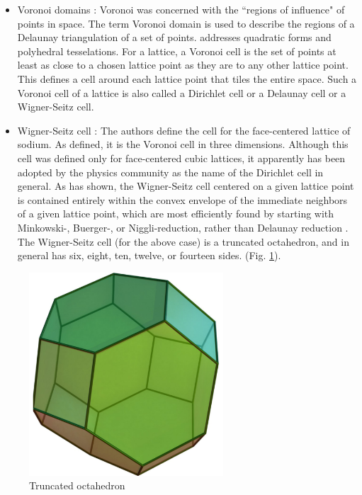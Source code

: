 \documentclass[preprint]{iucr}              %
\numberwithin{equation}{section}
\begin{document}
\begin{itemize}
\item{Voronoi domains \cite{Voronoi1908nouvelles}: 	Voronoi was concerned with the ``regions of influence" of points in
	space. The term Voronoi domain is used to describe the regions
	of a Delaunay triangulation of a set of points. 
	addresses quadratic forms and polyhedral tesselations.
	For a lattice, a Voronoi cell is the set of points
	at least as close to a chosen lattice point as they
	are to any other lattice point.  This defines a
	cell around each lattice point that tiles the entire
	space.  Such a Voronoi cell of a lattice is also
	called a Dirichlet cell or a Delaunay cell or a
	Wigner-Seitz cell.}
	
\item{Wigner-Seitz cell \cite{Wigner1933constitution}:	The authors define the cell for the face-centered lattice of sodium.
	As defined, it is the Voronoi cell  in three dimensions. Although 
	this cell was defined only for face-centered cubic lattices,
	it apparently has been adopted by the physics community as the
	name of the Dirichlet cell in general.  As  has shown, the
Wigner-Seitz cell centered on a given lattice point is contained entirely within the convex envelope of the immediate 
neighbors of a given lattice point, which are most efficiently
found by starting with Minkowski-, Buerger-, or Niggli-reduction, rather than Delaunay reduction \cite{bernstein2023invertible}.  The Wigner-Seitz cell (for the above case) is a truncated octahedron, and in general has six, eight, ten, twelve, or fourteen sides.
	(Fig. \ref{fig:octa}).
}
\end{itemize}

\begin{figure}
	\label{fig:octa}
	\caption{Truncated octahedron \cite{wikipeditrancatedoctahedron}}
	\includegraphics[width=7.25cm]{Truncatedoctahedron.pdf}
\end{figure}
\end{document}
